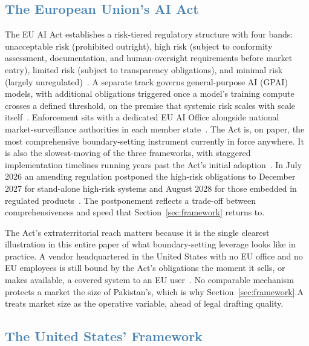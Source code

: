 \documentclass[journal]{IEEEtran}
\begin{document}
\subsection{\textcolor{steelblue}{The European Union's AI Act}}

The EU AI Act establishes a risk-tiered regulatory structure with four bands: unacceptable risk (prohibited outright), high risk (subject to conformity assessment, documentation, and human-oversight requirements before market entry), limited risk (subject to transparency obligations), and minimal risk (largely unregulated)~\cite{euaiact2024}.
A separate track governs general-purpose AI (GPAI) models, with additional obligations triggered once a model's training compute crosses a defined threshold, on the premise that systemic risk scales with scale itself~\cite{euaiact2024}.
Enforcement sits with a dedicated EU AI Office alongside national market-surveillance authorities in each member state~\cite{euaiact2024}.
The Act is, on paper, the most comprehensive boundary-setting instrument currently in force anywhere. It is also the slowest-moving of the three frameworks, with staggered implementation timelines running years past the Act's initial adoption~\cite{euaiact2024}. In July 2026 an amending regulation postponed the high-risk obligations to December 2027 for stand-alone high-risk systems and August 2028 for those embedded in regulated products~\cite{euaiomnibus2026}.
The postponement reflects a trade-off between comprehensiveness and speed that Section~\ref{sec:framework} returns to.

The Act's extraterritorial reach matters because it is the single clearest illustration in this entire paper of what boundary-setting leverage looks like in practice. A vendor headquartered in the United States with no EU office and no EU employees is still bound by the Act's obligations the moment it sells, or makes available, a covered system to an EU user~\cite{euaiact2024}.
No comparable mechanism protects a market the size of Pakistan's, which is why Section~\ref{sec:framework}.A treats market size as the operative variable, ahead of legal drafting quality.

\subsection{\textcolor{steelblue}{The United States' Framework}}
\end{document}
